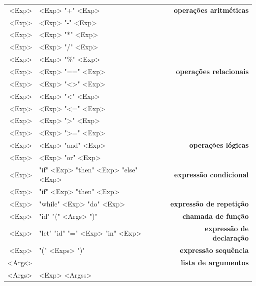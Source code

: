 \documentclass[a4paper,11pt,brazil]{article}
\begin{document}
\begin{gramatica}
\begin{synshorts}
\begin{mdframed}
\begin{tabular}{r@{$\;\rightarrow\;$}l>{\bfseries}r}
      <Exp>      & <Exp> "+" <Exp>                      & operações aritméticas   \\
      <Exp>      & <Exp> "-" <Exp>                      &                         \\
      <Exp>      & <Exp> "*" <Exp>                      &                         \\
      <Exp>      & <Exp> "/" <Exp>                      &                         \\
      <Exp>      & <Exp> "\%" <Exp>                     &                         \\
      <Exp>      & <Exp> "==" <Exp>                     & operações relacionais   \\
      <Exp>      & <Exp> "<>" <Exp>                     &                         \\
      <Exp>      & <Exp> "<" <Exp>                      &                         \\
      <Exp>      & <Exp> "<=" <Exp>                     &                         \\
      <Exp>      & <Exp> ">" <Exp>                      &                         \\
      <Exp>      & <Exp> ">=" <Exp>                     &                         \\
      <Exp>      & <Exp> "and" <Exp>                    & operações lógicas       \\
      <Exp>      & <Exp> "or" <Exp>                     &                         \\
      <Exp>      & "if" <Exp> "then" <Exp> "else" <Exp> & expressão condicional   \\
      <Exp>      & "if" <Exp> "then" <Exp>              &                         \\
      <Exp>      & "while" <Exp> "do" <Exp>             & expressão de repetição  \\
      <Exp>      & "id" "(" <Args> ")"                  & chamada de função       \\
      <Exp>      & "let" "id" "=" <Exp> "in" <Exp>      & expressão de declaração \\
      <Exp>      & "(" <Exps> ")"                       & expressão sequência     \\[.9em]
      <Args>     &                                      & lista de argumentos     \\
      <Args>     & <Exp> <Argss>                        &                         \\[.9em]

\end{tabular}
\end{mdframed}
\end{synshorts}
\end{gramatica}
\end{document}
